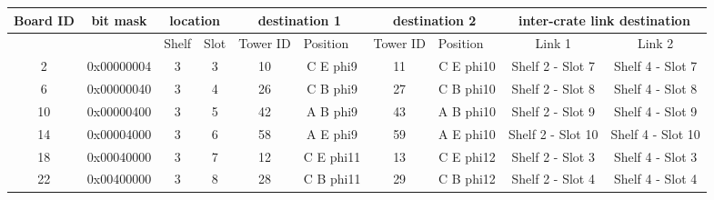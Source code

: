 \documentclass[11pt,letterpaper]{article}
\begin{document}
\begin{table}[h]
\tiny
\begin{tabular}{|c|c|c|c|c|c|c|c|c|c|}
\hline
Board ID               & bit mask              & \multicolumn{2}{c|}{location}                          & \multicolumn{2}{c|}{destination 1}                            & \multicolumn{2}{c|}{destination 2}                            & \multicolumn{2}{c|}{inter-crate link destination} \\ \hline
\multicolumn{1}{|l|}{} & \multicolumn{1}{l|}{} & \multicolumn{1}{l|}{Shelf} & \multicolumn{1}{l|}{Slot} & \multicolumn{1}{l|}{Tower ID} & \multicolumn{1}{l|}{Position} & \multicolumn{1}{l|}{Tower ID} & \multicolumn{1}{l|}{Position} & Link 1                  & Link 2                  \\ \hline
2                      & 0x00000004            & 3                          & 3                         & 10                            & C E phi9                      & 11                            & C E phi10                     & Shelf 2 - Slot 7        & Shelf 4 - Slot 7        \\ \hline
6                      & 0x00000040            & 3                          & 4                         & 26                            & C B phi9                      & 27                            & C B phi10                     & Shelf 2 - Slot 8        & Shelf 4 - Slot 8        \\ \hline
10                     & 0x00000400            & 3                          & 5                         & 42                            & A B phi9                      & 43                            & A B phi10                     & Shelf 2 - Slot 9        & Shelf 4 - Slot 9        \\ \hline
14                     & 0x00004000            & 3                          & 6                         & 58                            & A E phi9                      & 59                            & A E phi10                     & Shelf 2 - Slot 10       & Shelf 4 - Slot 10       \\ \hline
18                     & 0x00040000            & 3                          & 7                         & 12                            & C E phi11                     & 13                            & C E phi12                     & Shelf 2 - Slot 3        & Shelf 4 - Slot 3        \\ \hline
22                     & 0x00400000            & 3                          & 8                         & 28                            & C B phi11                     & 29                            & C B phi12                     & Shelf 2 - Slot 4        & Shelf 4 - Slot 4        \\ \hline

\end{tabular}
\end{table}
\end{document}
